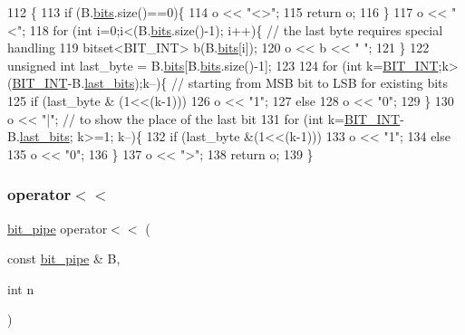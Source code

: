 \begin{DoxyCode}
112                                                     \{
113   \textcolor{keywordflow}{if} (B.\hyperlink{classbit__pipe_a86f38af1e9736b053728033490476b50}{bits}.size()==0)\{
114     o << \textcolor{stringliteral}{"<>"};
115     \textcolor{keywordflow}{return} o;
116   \}
117   o << \textcolor{stringliteral}{"<"};
118   \textcolor{keywordflow}{for} (\textcolor{keywordtype}{int} i=0;i<(B.\hyperlink{classbit__pipe_a86f38af1e9736b053728033490476b50}{bits}.size()-1); i++)\{ \textcolor{comment}{// the last byte requires special handling}
119     bitset<BIT\_INT> b(B.\hyperlink{classbit__pipe_a86f38af1e9736b053728033490476b50}{bits}[i]);
120     o << b << \textcolor{stringliteral}{" "};
121   \}
122   \textcolor{keywordtype}{unsigned} \textcolor{keywordtype}{int} last\_byte = B.\hyperlink{classbit__pipe_a86f38af1e9736b053728033490476b50}{bits}[B.\hyperlink{classbit__pipe_a86f38af1e9736b053728033490476b50}{bits}.size()-1];
123     
124   \textcolor{keywordflow}{for} (\textcolor{keywordtype}{int} k=\hyperlink{bitstream_8h_afcadf5aa65c5159bfb96c4d82ebc0a5d}{BIT\_INT};k>(\hyperlink{bitstream_8h_afcadf5aa65c5159bfb96c4d82ebc0a5d}{BIT\_INT}-B.\hyperlink{classbit__pipe_a0f3e84b02751803adaab499b5dad86fe}{last\_bits});k--)\{ \textcolor{comment}{// starting from MSB bit to LSB
       for existing bits}
125     \textcolor{keywordflow}{if} (last\_byte & (1<<(k-1)))
126       o << \textcolor{stringliteral}{"1"};
127     \textcolor{keywordflow}{else}
128       o << \textcolor{stringliteral}{"0"};
129   \}
130   o << \textcolor{stringliteral}{"|"}; \textcolor{comment}{// to show the place of the last bit}
131   \textcolor{keywordflow}{for} (\textcolor{keywordtype}{int} k=\hyperlink{bitstream_8h_afcadf5aa65c5159bfb96c4d82ebc0a5d}{BIT\_INT}-B.\hyperlink{classbit__pipe_a0f3e84b02751803adaab499b5dad86fe}{last\_bits}; k>=1; k--)\{
132     \textcolor{keywordflow}{if} (last\_byte &(1<<(k-1)))
133       o << \textcolor{stringliteral}{"1"};
134     \textcolor{keywordflow}{else}
135       o << \textcolor{stringliteral}{"0"};
136   \}
137   o << \textcolor{stringliteral}{">"};
138   \textcolor{keywordflow}{return} o;
139 \}
\end{DoxyCode}
\mbox{\label{classbit__pipe_a307267b689df83029a19dedf67cc4729}} 
\subsubsection{\texorpdfstring{operator$<$$<$}{operator<<}\hspace{0.1cm}{\footnotesize\ttfamily [2/2]}}
{\footnotesize\ttfamily \hyperlink{classbit__pipe}{bit\+\_\+pipe} operator$<$$<$ (\begin{DoxyParamCaption}\item[{const \hyperlink{classbit__pipe}{bit\+\_\+pipe} \&}]{B,  }\item[{int}]{n }\end{DoxyParamCaption})\hspace{0.3cm}{\ttfamily [friend]}}



